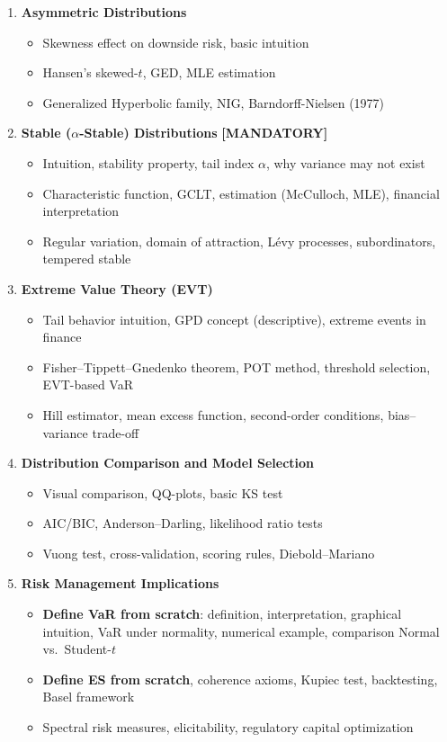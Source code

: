 \documentclass[11pt, a4paper]{article}
\newcommand{\layerY}[1]{\textcolor{MainBlue}{\textbf{[Y3]}} #1}
\newcommand{\layerM}[1]{\textcolor{Forest}{\textbf{[MSc]}} #1}
\newcommand{\layerP}[1]{\textcolor{Purple}{\textbf{[PhD]}} #1}
\theoremstyle{definition}
\begin{document}
\begin{enumerate}[label=\textbf{2.\arabic*}, leftmargin=2cm]
\item \textbf{Asymmetric Distributions}
  \begin{itemize}[nosep]
    \item[\layerY{}] Skewness effect on downside risk, basic intuition
    \item[\layerM{}] Hansen's skewed-$t$, GED, MLE estimation
    \item[\layerP{}] Generalized Hyperbolic family, NIG, Barndorff-Nielsen (1977)
  \end{itemize}

\item \textbf{Stable ($\alpha$-Stable) Distributions} \textbf{[MANDATORY]}
  \begin{itemize}[nosep]
    \item[\layerY{}] Intuition, stability property, tail index $\alpha$, why variance may not exist
    \item[\layerM{}] Characteristic function, GCLT, estimation (McCulloch, MLE), financial interpretation
    \item[\layerP{}] Regular variation, domain of attraction, Lévy processes, subordinators, tempered stable
  \end{itemize}

\item \textbf{Extreme Value Theory (EVT)}
  \begin{itemize}[nosep]
    \item[\layerY{}] Tail behavior intuition, GPD concept (descriptive), extreme events in finance
    \item[\layerM{}] Fisher--Tippett--Gnedenko theorem, POT method, threshold selection, EVT-based VaR
    \item[\layerP{}] Hill estimator, mean excess function, second-order conditions, bias--variance trade-off
  \end{itemize}

\item \textbf{Distribution Comparison and Model Selection}
  \begin{itemize}[nosep]
    \item[\layerY{}] Visual comparison, QQ-plots, basic KS test
    \item[\layerM{}] AIC/BIC, Anderson--Darling, likelihood ratio tests
    \item[\layerP{}] Vuong test, cross-validation, scoring rules, Diebold--Mariano
  \end{itemize}

\item \textbf{Risk Management Implications}
  \begin{itemize}[nosep]
    \item[\layerY{}] \textbf{Define VaR from scratch}: definition, interpretation, graphical intuition, VaR under normality, numerical example, comparison Normal vs.\ Student-$t$
    \item[\layerM{}] \textbf{Define ES from scratch}, coherence axioms, Kupiec test, backtesting, Basel framework
    \item[\layerP{}] Spectral risk measures, elicitability, regulatory capital optimization
  \end{itemize}


\end{enumerate}
\end{document}
